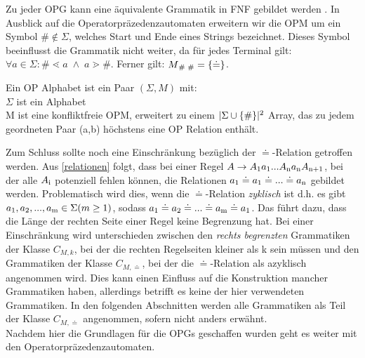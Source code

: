 Zu jeder OPG kann eine äquivalente Grammatik in FNF gebildet werden \cite{og}.
In Ausblick auf die Operatorpräzedenzautomaten erweitern wir die OPM um ein Symbol $\# \notin \Sigma$, welches Start und Ende eines Strings bezeichnet. Dieses Symbol beeinflusst die Grammatik nicht weiter, da für jedes Terminal gilt: $\forall a \in \Sigma: \# \lessdot a \; \wedge\; a \gtrdot \#$. Ferner gilt: $M\textsubscript{\# \#}=\{ \doteq \}$.
\begin{definition}[OP Alphabet]
Ein OP Alphabet ist ein Paar $(\Sigma, M)$ mit:\\
$\Sigma$ ist ein Alphabet \\
M ist eine konfliktfreie OPM, erweitert zu einem $ |\Sigma \cup \{\#\}|\textsuperscript{2}$ Array, das zu jedem geordneten Paar (a,b) höchstens eine OP Relation enthält.
\end{definition} 
Zum Schluss sollte noch eine Einschränkung bezüglich der $\doteq$-Relation getroffen werden. Aus \ref{relationen} folgt, dass bei einer Regel $A \rightarrow  A \textsubscript{1} a \textsubscript{1}... A \textsubscript{n} a \textsubscript{n} A \textsubscript{n+1}$, bei der alle $A \textsubscript{i}$ potenziell fehlen können, die Relationen $a\textsubscript{1} \doteq a \textsubscript{1} \doteq ... \doteq a \textsubscript{n}$ gebildet werden. Problematisch wird dies, wenn die $\doteq$-Relation \textit{zyklisch} ist d.h. es gibt $a\textsubscript{1}, a\textsubscript{2}, ..., a \textsubscript{m} \in \Sigma (m \geq  1)$, sodass $a\textsubscript{1} \doteq a \textsubscript{2} \doteq ... \doteq a \textsubscript{m} \doteq a \textsubscript{1}$. Das führt dazu, dass die Länge der rechten Seite einer Regel keine Begrenzung hat. Bei einer Einschränkung wird unterschieden zwischen den \textit{rechts begrenzten} Grammatiken der Klasse $C_{M,k}$, bei der die rechten Regelseiten kleiner als k sein müssen und den Grammatiken der Klasse $C_{M,\doteq}$, bei der die $\doteq$-Relation als azyklisch angenommen wird. Dies kann einen Einfluss auf die Konstruktion mancher Grammatiken haben, allerdings betrifft es keine der hier verwendeten Grammatiken. In den folgenden Abschnitten werden alle Grammatiken als Teil der Klasse $C_{M,\doteq}$ angenommen, sofern nicht anders erwähnt.\\
Nachdem hier die Grundlagen für die OPGs geschaffen wurden geht es weiter mit den Operatorpräzedenzautomaten.

